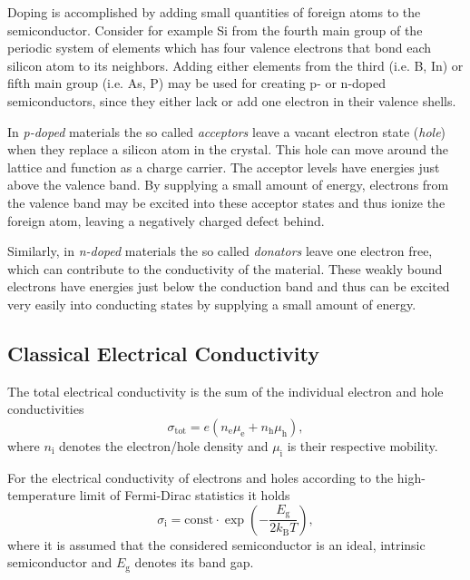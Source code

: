Doping is accomplished by adding small quantities of foreign atoms to the semiconductor.
Consider for example Si from the fourth main group of the periodic system of elements which has four valence electrons that bond each silicon atom to its neighbors.
Adding either elements from the third (i.e. B, In) or fifth main group (i.e. As, P) may be used for creating p- or n-doped semiconductors, since they either lack or add one electron in their valence shells.

In \textit{p-doped} materials the so called \textit{acceptors} leave a vacant electron state (\textit{hole}) when they replace a silicon atom in the crystal.
This hole can move around the lattice and function as a charge carrier.
The acceptor levels have energies just above the valence band.
By supplying a small amount of energy, electrons from the valence band may be excited into these acceptor states and thus ionize the foreign atom, leaving a negatively charged defect behind.

Similarly, in \textit{n-doped} materials the so called \textit{donators} leave one electron free, which can contribute to the conductivity of the material.
These weakly bound electrons have energies just below the conduction band and thus can be excited very easily into conducting states by supplying a small amount of energy.

\subsection{Classical Electrical Conductivity}
The total electrical conductivity is the sum of the individual electron and hole conductivities
\begin{equation*}
	\sigma_\text{tot} = e\left(n_\text{e} \mu_\text{e} + n_\text{h} \mu_\text{h}\right),
\end{equation*}
where $n_\text{i}$ denotes the electron/hole density and $\mu_\text{i}$ is their respective mobility.

For the electrical conductivity of electrons and holes according to the high-temperature limit of Fermi-Dirac statistics it holds
\begin{equation*}
	\sigma_\text{i} = \text{const}\cdot\exp\left(-\frac{E_\text{g}}{2k_\text{B}T}\right),
\end{equation*}
where it is assumed that the considered semiconductor is an ideal, intrinsic semiconductor and $E_\text{g}$ denotes its band gap.

